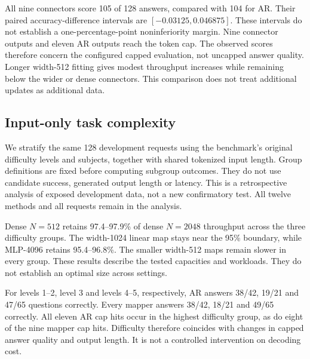 \documentclass{article}
\begin{document}
All nine connectors score 105 of 128 answers, compared with 104 for AR.
Their paired accuracy-difference intervals are $[-0.03125,0.046875]$.
These intervals do not establish a one-percentage-point noninferiority
margin. Nine connector outputs and eleven AR outputs reach the token cap.
The observed scores therefore concern the configured capped evaluation,
not uncapped answer quality. Longer width-512 fitting gives modest
throughput increases while remaining below the wider or dense connectors.
This comparison does not treat additional updates as additional data.

\clearpage
\subsection{Input-only task complexity}

We stratify the same 128 development requests using the benchmark's
original difficulty levels and subjects, together with shared tokenized
input length. Group definitions are fixed before computing subgroup
outcomes. They do not use candidate success, generated output length or
latency. This is a retrospective analysis of exposed development data,
not a new confirmatory test. All twelve methods and all requests remain
in the analysis.

\begin{table}[H]
\caption{Throughput retained from dense $N=2048$ within each MATH
difficulty group, in percent with descriptive paired 95\% intervals.
All fits use 8,192 updates except the continued width-512 fits, which use
32,768 updates on the same 2,048 examples. For fitted maps, unspecified $N$ is 2,048.
Intervals do not adjust for multiple subgroup comparisons or model selection.}
\label{tab:task-difficulty}
\centering\footnotesize
\setlength{\tabcolsep}{3pt}

\end{table}

Dense $N=512$ retains 97.4--97.9\% of dense $N=2048$ throughput across
the three difficulty groups. The width-1024 linear map stays near the
95\% boundary, while MLP-4096 retains 95.4--96.8\%. The smaller width-512
maps remain slower in every group. These results describe the tested
capacities and workloads. They do not establish an optimal size across settings.

For levels 1--2, level 3 and levels 4--5, respectively, AR answers
38/42, 19/21 and 47/65 questions correctly. Every mapper answers
38/42, 18/21 and 49/65 correctly. All eleven AR cap hits occur in the
highest difficulty group, as do eight of the nine mapper cap hits.
Difficulty therefore coincides with changes in capped answer quality
and output length. It is not a controlled intervention on decoding cost.
\end{document}
